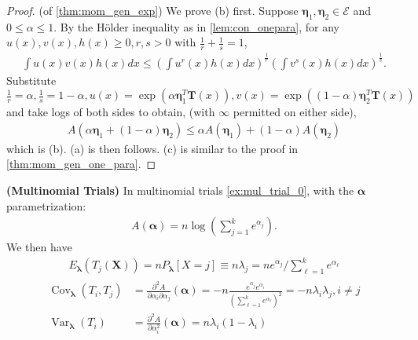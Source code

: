 \documentclass{article}
\newcommand{\bfs}[1]{\textbf{({#1}) }}
\begin{document}
\begin{proof} (of \cref{thm:mom_gen_exp}) We prove (b) first. Suppose $\boldsymbol{\eta}_{1}, \boldsymbol{\eta}_{2} \in \mathcal{E}$ and $0 \leq \alpha \leq 1$. By the Hölder inequality as in \cref{lem:con_onepara}, for any $u(x), v(x), h(x) \geq 0, r, s>0$ with $\frac{1}{r}+\frac{1}{s}=1$,
\begin{align*}
\int u(x) v(x) h(x) d x \leq\left(\int u^{r}(x) h(x) d x\right)^{\frac{1}{r}}\left(\int v^{s}(x) h(x) d x\right)^{\frac{1}{s}} .
\end{align*}
Substitute $\frac{1}{r}=\alpha, \frac{1}{s}=1-\alpha, u(x)=\exp \left(\alpha \boldsymbol{\eta}_{1}^{T} \mathbf{T}(x)\right), v(x)=\exp \left((1-\alpha) \boldsymbol{\eta}_{2}^{T} \mathbf{T}(x)\right)$ and take logs of both sides to obtain, (with $\infty$ permitted on either side),
\begin{align*}
A\left(\alpha \boldsymbol{\eta}_{1}+(1-\alpha) \boldsymbol{\eta}_{2}\right) \leq \alpha A\left(\boldsymbol{\eta}_{1}\right)+(1-\alpha) A\left(\boldsymbol{\eta}_{2}\right)
\end{align*}
which is (b). (a) is then follows. (c) is similar to the proof in \cref{thm:mom_gen_one_para}.
\end{proof}
\begin{exma}\bfs{Multinomial Trials}\label{ex:mul_trial_1} 
In multinomial trials \cref{ex:mul_trial_0}, with the $\boldsymbol{\alpha}$ parametrization:
\begin{align*}
A(\boldsymbol{\alpha})=n \log \left(\sum_{j=1}^{k} e^{\alpha_{j}}\right).
\end{align*}
We then have
\begin{align*}
E_{\boldsymbol{\lambda}}\left(T_{j}(\mathbf{X})\right)=n P_{\boldsymbol{\lambda}}[X=j] \equiv n \lambda_{j}=n e^{\alpha_{j}} / \sum_{\ell=1}^{k} e^{\alpha_{\ell}}
\end{align*}
\begin{align*}
\begin{aligned}
\operatorname{Cov}_{\boldsymbol{\lambda}}\left(T_{i}, T_{j}\right) &=\frac{\partial^{2} A}{\partial \alpha_{i} \partial \alpha_{j}}(\boldsymbol{\alpha})=-n \frac{e^{\alpha_{j}} e^{\alpha_{i}}}{\left(\sum_{\ell=1}^{k} e^{\alpha_{\ell}}\right)^{2}}=-n \lambda_{i} \lambda_{j}, i \neq j \\
\operatorname{Var}_{\boldsymbol{\lambda}}\left(T_{i}\right) &=\frac{\partial^{2} A}{\partial \alpha_{i}^{2}}(\boldsymbol{\alpha})=n \lambda_{i}\left(1-\lambda_{i}\right)
\end{aligned}
\end{align*}
\end{exma}
\end{document}
